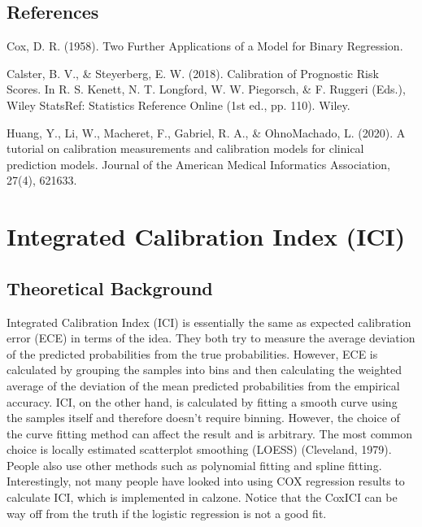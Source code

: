 \documentclass[letterpaper,10pt,english]{sphinxmanual}
\begin{document}
\section{References}
\label{\detokenize{notebooks/cox:References}}
\sphinxAtStartPar
Cox, D. R. (1958). Two Further Applications of a Model for Binary Regression.

\sphinxAtStartPar
Calster, B. V., \& Steyerberg, E. W. (2018). Calibration of Prognostic Risk Scores. In R. S. Kenett, N. T. Longford, W. W. Piegorsch, \& F. Ruggeri (Eds.), Wiley StatsRef: Statistics Reference Online (1st ed., pp. 1\textendash{}10). Wiley. 

\sphinxAtStartPar
Huang, Y., Li, W., Macheret, F., Gabriel, R. A., \& Ohno\sphinxhyphen{}Machado, L. (2020). A tutorial on calibration measurements and calibration models for clinical prediction models. Journal of the American Medical Informatics Association, 27(4), 621\textendash{}633. 

\sphinxstepscope


\chapter{Integrated Calibration Index (ICI)}
\label{\detokenize{notebooks/ici:Integrated-Calibration-Index-(ICI)}}\label{\detokenize{notebooks/ici::doc}}

\section{Theoretical Background}
\label{\detokenize{notebooks/ici:Theoretical-Background}}
\sphinxAtStartPar
Integrated Calibration Index (ICI) is essentially the same as expected calibration error (ECE) in terms of the idea. They both try to measure the average deviation of the predicted probabilities from the true probabilities. However, ECE is calculated by grouping the samples into bins and then calculating the weighted average of the deviation of the mean predicted probabilities from the empirical accuracy. ICI, on the other hand, is calculated by fitting a smooth curve using the samples itself
and therefore doesn’t require binning. However, the choice of the curve fitting method can affect the result and is arbitrary. The most common choice is locally estimated scatterplot smoothing (LOESS) (Cleveland, 1979). People also use other methods such as polynomial fitting and spline fitting. Interestingly, not many people have looked into using COX regression results to calculate ICI, which is implemented in calzone. Notice that the Cox\sphinxhyphen{}ICI can be way off from the truth if the logistic
regression is not a good fit.
\end{document}

